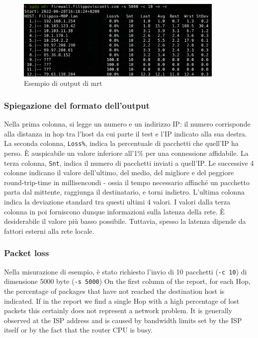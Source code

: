 \begin{figure}[ht]
    \centering
    \includegraphics[width=10cm]{figure/mtrSample.png}
    \caption{Esempio di output di mrt}
\end{figure}

\subsubsection{Spiegazione del formato dell'output}
Nella prima colonna, si legge un numero e un indirizzo IP: il numero corrisponde alla distanza in hop tra l'host da cui parte il test e l'IP indicato alla sua destra.
La seconda colonna, \texttt{Loss\%}, indica la percentuale di pacchetti che quell'IP ha perso. È auspicabile un valore inferiore all'1\% per una connessione affidabile.
La terza colonna, \texttt{Snt}, indica il numero di pacchetti inviati a quell'IP.
Le successive 4 colonne indicano il valore dell'ultimo, del medio, del migliore e del peggiore round-trip-time in millisencondi - ossia il tempo necessario affinché un pacchetto parta dal mittente, raggiunga il destinatario, e torni indietro.
L'ultima colonna indica la deviazione standard tra questi ultimi 4 valori.
I valori dalla terza colonna in poi forniscono dunque informazioni sulla latenza della rete. È desiderabile il valore più basso possibile. Tuttavia,  spesso la latenza dipende da fattori esterni alla rete locale.

\subsubsection{Packet loss}
Nella misurazione di esempio, è stato richiesto l'invio di 10 pacchetti (\texttt{-c 10}) di dimensione 5000 byte (\texttt{-s 5000})
On the first column of the report, for each Hop, the percentage of packages that have not reached the destination host is indicated. If in the report we find a single Hop with a high percentage of lost packets this certainly does not represent a network problem. It is generally observed at the ISP address and is caused by bandwidth limits set by the ISP itself or by the fact that the router CPU is busy.

